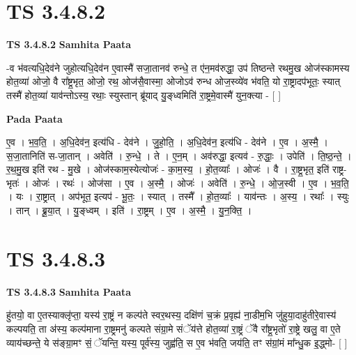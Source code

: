 \documentclass[17pt]{extarticle}
\begin{document}
\section*{ TS 3.4.8.2 }

\textbf{TS 3.4.8.2 } \newline
\textbf{Samhita Paata} \newline

-व भ॑वत्यधि॒देव॑ने जुहोत्यधि॒देव॑न ए॒वास्मै॑ सजा॒तानव॑ रुन्धे॒ त ए॑न॒मव॑रुद्धा॒ उप॑ तिष्ठन्ते रथमु॒ख ओज॑स्कामस्य होत॒व्या॑ ओजो॒ वै रा᳚ष्ट्र॒भृत॒ ओजो॒ रथ॒ ओज॑सै॒वास्मा॒ ओजोऽव॑ रुन्ध ओज॒स्व्ये॑व भ॑वति॒ यो रा॒ष्ट्रादप॑भूतः॒ स्यात् तस्मै॑ होत॒व्या॑ याव॑न्तोऽस्य॒ रथाः॒ स्युस्तान् ब्रू॑याद् यु॒ङ्ध्वमिति॑ रा॒ष्ट्रमे॒वास्मै॑ युन॒क्त्या - [  ] \newline

\textbf{Pada Paata} \newline

ए॒व । भ॒व॒ति॒ । अ॒धि॒देव॑न॒ इत्य॑धि - देव॑ने । जु॒हो॒ति॒ । अ॒धि॒देव॑न॒ इत्य॑धि - देव॑ने । ए॒व । अ॒स्मै॒ । स॒जा॒तानिति॑ स-जा॒तान् । अवेति॑ । रु॒न्धे॒ । ते । ए॒न॒म् । अव॑रुद्धा॒ इत्यव॑ - रु॒द्धाः॒ । उपेति॑ । ति॒ष्ठ॒न्ते॒ । र॒थ॒मु॒ख इति॑ रथ - मु॒खे । ओज॑स्काम॒स्येत्योजः॑ - का॒म॒स्य॒ । हो॒त॒व्याः᳚ । ओजः॑ । वै । रा॒ष्ट्र॒भृत॒ इति॑ राष्ट्र-भृतः॑ । ओजः॑ । रथः॑ । ओज॑सा । ए॒व । अ॒स्मै॒ । ओजः॑ । अवेति॑ । रु॒न्धे॒ । ओ॒ज॒स्वी । ए॒व । भ॒व॒ति॒ । यः । रा॒ष्ट्रात् । अप॑भूत॒ इत्यप॑ - भू॒तः॒ । स्यात् । तस्मै᳚ । हो॒त॒व्याः᳚ । याव॑न्तः । अ॒स्य॒ । रथाः᳚ । स्युः । तान् । ब्रू॒या॒त् । यु॒ङ्ध्वम् । इति॑ । रा॒ष्ट्रम् । ए॒व । अ॒स्मै॒ । यु॒न॒क्ति॒ ।  \newline




\section*{ TS 3.4.8.3 }

\textbf{TS 3.4.8.3 } \newline
\textbf{Samhita Paata} \newline

हु॑तयो॒ वा ए॒तस्याक्लृ॑प्ता॒ यस्य॑ रा॒ष्ट्रं न कल्प॑ते स्वर॒थस्य॒ दक्षि॑णं च॒क्रं प्र॒वृह्य॑ ना॒डीम॒भि जु॑हुया॒दाहु॑तीरे॒वास्य॑ कल्पयति॒ ता अ॑स्य॒ कल्प॑माना रा॒ष्ट्रमनु॑ कल्पते संग्रा॒मे संॅय॑त्ते होत॒व्या॑ रा॒ष्ट्रं ॅवै रा᳚ष्ट्र॒भृतो॑ रा॒ष्ट्रे खलु॒ वा ए॒ते व्याय॑च्छन्ते॒ ये स॑ङ्ग्रा॒मꣳ सं॒ ॅयन्ति॒ यस्य॒ पूर्व॑स्य॒ जुह्व॑ति॒ स ए॒व भ॑वति॒ जय॑ति॒ तꣳ स॑ग्रां॒मं मा᳚न्धु॒क इ॒द्ध्मो- [  ] \newline
\end{document}
